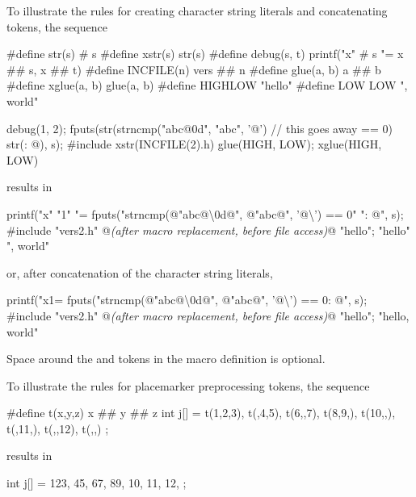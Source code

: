 \pnum
\begin{example}
To illustrate the rules for creating character string literals
and concatenating tokens,
the sequence

\begin{codeblock}
#define str(s)      # s
#define xstr(s)     str(s)
#define debug(s, t) printf("x" # s "= %
               x ## s, x ## t)
#define INCFILE(n)  vers ## n
#define glue(a, b)  a ## b
#define xglue(a, b) glue(a, b)
#define HIGHLOW     "hello"
#define LOW         LOW ", world"

debug(1, 2);
fputs(str(strncmp("abc@\textbackslash@0d", "abc", '@')  // this goes away
    == 0) str(: @\atsign\textbackslash@n), s);
#include xstr(INCFILE(2).h)
glue(HIGH, LOW);
xglue(HIGH, LOW)
\end{codeblock}

results in

\begin{codeblock}
printf("x" "1" "= %
fputs("strncmp(@\textbackslash@"abc@\textbackslash\textbackslash@0d@\textbackslash@", @\textbackslash@"abc@\textbackslash@", '@\textbackslash{}') == 0" ": @\atsign\textbackslash@n", s);
#include "vers2.h"    @\textit{(after macro replacement, before file access)}@
"hello";
"hello" ", world"
\end{codeblock}

or, after concatenation of the character string literals,

\begin{codeblock}
printf("x1= %
fputs("strncmp(@\textbackslash@"abc@\textbackslash\textbackslash@0d@\textbackslash@", @\textbackslash@"abc@\textbackslash@", '@\textbackslash{}') == 0: @\atsign\textbackslash@n", s);
#include "vers2.h"    @\textit{(after macro replacement, before file access)}@
"hello";
"hello, world"
\end{codeblock}

Space around the
\tcode{\#}
and
\tcode{\#\#}
tokens in the macro definition is optional.
\end{example}

\pnum
\begin{example}
To illustrate the rules for placemarker preprocessing tokens, the sequence

\begin{codeblock}
#define t(x,y,z) x ## y ## z
int j[] = { t(1,2,3), t(,4,5), t(6,,7), t(8,9,),
  t(10,,), t(,11,), t(,,12), t(,,) };
\end{codeblock}

results in

\begin{codeblock}
int j[] = { 123, 45, 67, 89,
  10, 11, 12, };
\end{codeblock}
\end{example}

